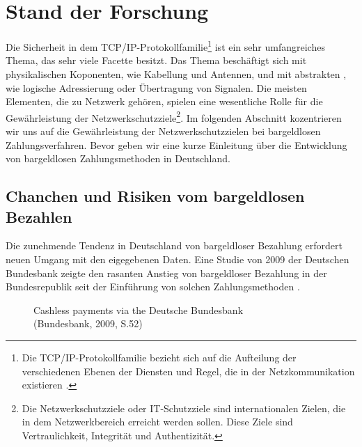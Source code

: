 \section{Stand der Forschung}

Die Sicherheit in dem TCP/IP-Protokollfamilie\footnote{Die TCP/IP-Protokollfamilie bezieht sich auf die Aufteilung 
der verschiedenen Ebenen der Diensten und Regel, die in der Netzkommunikation existieren \cite{refbook:SWIS}.} ist 
ein sehr umfangreiches Thema, das sehr viele Facette besitzt. Das Thema beschäftigt sich mit physikalischen 
Koponenten, wie Kabellung und Antennen, und mit abstrakten , wie logische Adressierung oder Übertragung von Signalen.
Die meisten Elementen, die zu Netzwerk gehören, spielen eine wesentliche Rolle für die Gewährleistung
der Netzwerkschutzziele\footnote{Die Netzwerkschutzziele oder IT-Schutzziele sind internationalen Zielen, 
die in dem Netzwerkbereich erreicht werden sollen. Diese Ziele sind Vertraulichkeit, Integrität und 
Authentizität.}. Im folgenden Abschnitt kozentrieren wir uns auf die Gewährleistung der Netzwerkschutzzielen
bei bargeldlosen Zahlungsverfahren. Bevor geben wir eine kurze Einleitung über die Entwicklung von bargeldlosen
Zahlungsmethoden in Deutschland.


\subsection{Chanchen und Risiken vom bargeldlosen Bezahlen}

Die zunehmende Tendenz in Deutschland von bargeldloser Bezahlung erfordert neuen Umgang mit den 
eigegebenen Daten. Eine Studie von 2009 der Deutschen Bundesbank zeigte den rasanten Anstieg von 
bargeldloser Bezahlung in der Bundesrepublik seit der Einführung von solchen Zahlungsmethoden 
\cite{refrep:DBCP}.

\begin{figure}[htb]
    \caption{Cashless payments via the Deutsche Bundesbank\\ (Bundesbank, 2009, S.52)}
    \label{fig:refrep_DB}
\end{figure}


